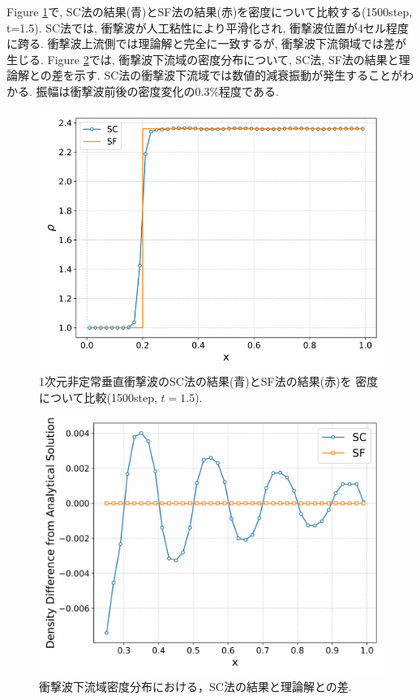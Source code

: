 \documentclass[a4j]{jarticle}
\begin{document}
Figure \ref{fig:1Dscsfa}で, SC法の結果(青)とSF法の結果(赤)を密度について比較する(1500step, t=1.5).
SC法では, 衝撃波が人工粘性により平滑化され, 衝撃波位置が4セル程度に跨る.
衝撃波上流側では理論解と完全に一致するが, 衝撃波下流領域では差が生じる.
Figure \ref{fig:1Dscsfb}では, 衝撃波下流域の密度分布について, SC法, SF法の結果と理論解との差を示す.
SC法の衝撃波下流域では数値的減衰振動が発生することがわかる.
振幅は衝撃波前後の密度変化の0.3\%程度である.
\begin{figure}[h]
  \centering
  \includegraphics[width=\linewidth]{1Dscsfa.pdf}
  \caption{%
    1次元非定常垂直衝撃波のSC法の結果(青)とSF法の結果(赤)を
    密度について比較(1500step, $t=1.5$).
  }
  \label{fig:1Dscsfa}
\end{figure}

\begin{figure}[h]
  \centering
  \includegraphics[width=\linewidth]{1Dscsfb.pdf}
  \caption{%
    衝撃波下流域密度分布における，SC法の結果と理論解との差.
  }
  \label{fig:1Dscsfb}
\end{figure}
\end{document}
